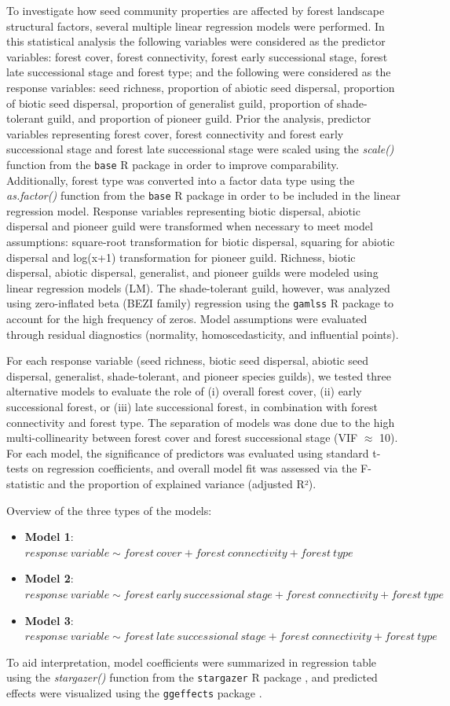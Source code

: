 To investigate how seed community properties are affected by forest landscape structural factors, several multiple linear regression models were performed. In this statistical analysis the following variables were considered as the predictor variables: forest cover, forest connectivity, forest early successional stage, forest late successional stage and forest type; and the following were considered as the response variables: seed richness, proportion of abiotic seed dispersal, proportion of biotic seed dispersal, proportion of generalist guild, proportion of shade-tolerant guild, and proportion of pioneer guild.
Prior the analysis, predictor variables representing forest cover, forest connectivity and forest early successional stage and forest late successional stage were scaled using the \textit{scale()} function from the \texttt{base} R package in order to improve comparability. Additionally, forest type was converted into a factor data type using the \textit{as.factor()} function from the \texttt{base} R package in order to be included in the linear regression model. 
Response variables representing biotic dispersal, abiotic dispersal and pioneer guild were transformed when necessary to meet model assumptions: square‐root transformation for biotic dispersal, squaring for abiotic dispersal and log(x+1) transformation for pioneer guild. Richness, biotic dispersal, abiotic dispersal, generalist, and pioneer guilds were modeled using linear regression models (LM). The shade-tolerant guild, however, was analyzed using zero-inflated beta (BEZI family) regression using the \texttt{gamlss} R package  to account for the high frequency of zeros. Model assumptions were evaluated through residual diagnostics (normality, homoscedasticity, and influential points). 

For each response variable (seed richness, biotic seed dispersal, abiotic seed dispersal, generalist, shade-tolerant, and pioneer species guilds), we tested three alternative models to evaluate the role of (i) overall forest cover, (ii) early successional forest, or (iii) late successional forest, in combination with forest connectivity and forest type. The separation of models was done due to the high multi-collinearity between forest cover and forest successional stage (VIF $\approx$ 10). For each model, the significance of predictors was evaluated using standard t-tests on regression coefficients, and overall model fit was assessed via the F-statistic and the proportion of explained variance (adjusted R²). 

Overview of the three types of the models:
\begin{itemize}
    \item \textbf{Model 1}: $response\ variable \sim forest\  cover + forest\ connectivity + forest\ type$ 
    \item \textbf{Model 2}: $response\ variable \sim forest\ early\ successional\ stage + forest\ connectivity + forest\ type$
    \item \textbf{Model 3}: $response\ variable \sim forest\ late\ successional\ stage + forest\ connectivity + forest\ type$
\end{itemize}

To aid interpretation, model coefficients were summarized in regression table using the \textit{stargazer()} function from the \texttt{stargazer} R package \citep{hlavac2022package}, and predicted effects were visualized using the \texttt{ggeffects} package \citep{ludecke2020package}. 

 